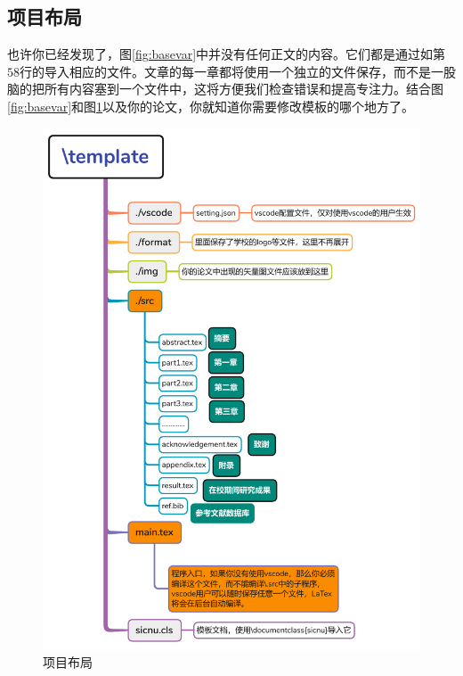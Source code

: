 \subsection{项目布局}
\par 也许你已经发现了，图\ref{fig:basevar}中并没有任何正文的内容。它们都是通过如第$58$行的\verb||导入相应的文件。文章的每一章都将使用一个独立的文件保存，而不是一股脑的把所有内容塞到一个文件中，这将方便我们检查错误和提高专注力。结合图\ref{fig:basevar}和图\ref{fig:projstru}以及你的论文，你就知道你需要修改模板的哪个地方了。

\begin{figure}[H]
    \centering
    \includegraphics[scale=0.8]{img/struct.pdf}
    \caption{项目布局}
    \label{fig:projstru}
\end{figure}


